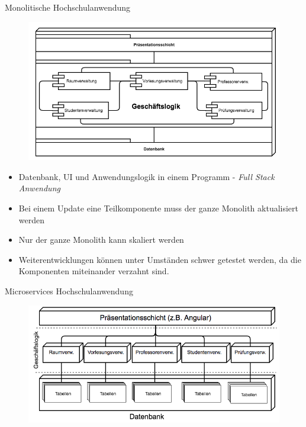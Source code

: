 \documentclass[final]{beamer}
\newlength{\onecolwid}
\begin{document}
\begin{frame}
\begin{columns}[t]
\begin{column}{\onecolwid}
\begin{block}{Monolitische Hochschulanwendung}

\begin{figure}
\includegraphics{monolithic_good}	
\end{figure}

\begin{itemize}
	\item Datenbank, UI und Anwendungslogik in einem
Programm - \textit{Full Stack Anwendung}
	\item Bei einem Update eine Teilkomponente muss
der ganze Monolith aktualisiert werden
	\item Nur der ganze Monolith kann skaliert werden
\item Weiterentwicklungen können unter Umständen schwer getestet werden, da die Komponenten miteinander verzahnt sind.
\end{itemize}

\end{block}


\begin{block}{Microservices Hochschulanwendung}

\begin{figure}
\includegraphics{microservice}	
\end{figure}


\end{block}
\end{column}
\end{columns}
\end{frame}
\end{document}
